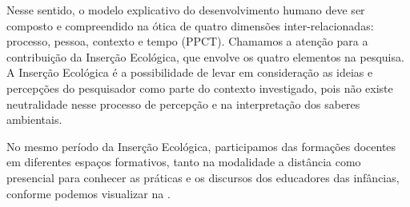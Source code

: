 \documentclass{textolivre}
\begin{document}
Nesse sentido, o modelo explicativo do desenvolvimento humano deve ser composto e compreendido na ótica de quatro dimensões inter-relacionadas: processo, pessoa, contexto e tempo (PPCT). Chamamos a atenção para a contribuição da Inserção Ecológica, que envolve os quatro elementos na pesquisa. A Inserção Ecológica \cite{silveira2009,piske2018c,koller2016} é a possibilidade de levar em consideração as ideias e percepções do pesquisador como parte do contexto investigado, pois não existe neutralidade nesse processo de percepção e na interpretação dos saberes ambientais.

No mesmo período da Inserção Ecológica, participamos das formações docentes em diferentes espaços formativos, tanto na modalidade a distância como presencial para conhecer as práticas e os discursos dos educadores das infâncias, conforme podemos visualizar na .  
\end{document}
